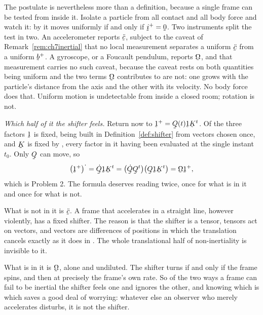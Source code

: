 \begin{remark}
The postulate is nevertheless more than a definition, because a single
frame can be tested from inside it. Isolate a particle from all contact
and all body force and watch it: by  it moves uniformly if and
only if $\vek{i}^{+}=\bze$. Two instruments split the test in two. An
accelerometer reports $\ddot\bc$, subject to the caveat of
Remark~\ref{rem:ch7inertial} that no local measurement separates a
uniform $\ddot\bc$ from a uniform $\bb^{+}$. A gyroscope, or a Foucault
pendulum, reports $\bOm$, and that measurement carries no such caveat,
because the caveat rests on both quantities being uniform and the two
terms $\bOm$ contributes to  are not: one grows with the
particle's distance from the axis and the other with its velocity. No
body force does that. Uniform motion is undetectable from inside a closed
room; rotation is not.

\emph{Which half of it the shifter feels.} Return now to
$\shift^{+}=\bQ(t)\shift\bK^{t}$. Of the three factors $\shift$ is fixed,
being built in Definition~\ref{def:shifter} from vectors chosen once, and
$\bK$ is fixed by , every factor in it having been evaluated at
the single instant $t_{0}$. Only $\bQ$ can move, so
\[
   \big(\shift^{+}\big)^{\textstyle\cdot}
   =\dot\bQ\shift\bK^{t}
   =\big(\dot\bQ\bQ^{t}\big)\big(\bQ\shift\bK^{t}\big)
   =\bOm\shift^{+},
\]
which is Problem 2. The formula deserves reading twice, once for what is
in it and once for what is not.

What is not in it is $\ddot\bc$. A frame that accelerates in a straight
line, however violently, has a fixed shifter. The reason is that the
shifter is a tensor, tensors act on vectors, and vectors are differences
of positions in which the translation cancels exactly as it does in
. The whole translational half of non-inertiality is invisible
to it.

What is in it is $\bOm$, alone and undiluted. The shifter turns if and
only if the frame spins, and then at precisely the frame's own rate. So
of the two ways a frame can fail to be inertial the shifter feels one and
ignores the other, and knowing which is which saves a good deal of
worrying: whatever else an observer who merely accelerates disturbs, it
is not the shifter.


\end{remark}
